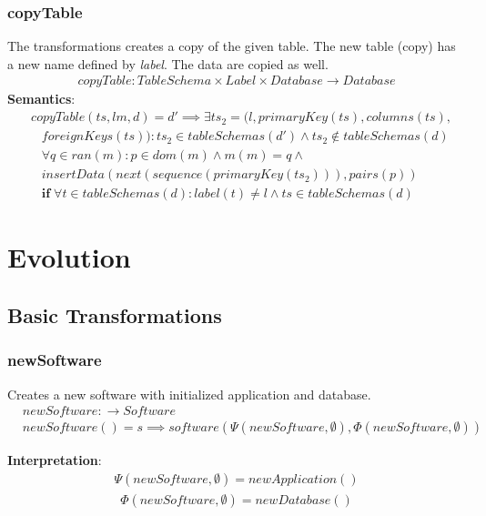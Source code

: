 \documentclass[10pt]{article}
\begin{document}
\subsubsection{copyTable}
The transformations creates a copy of the given table. The new table (copy) has a new name defined by \emph{label}. The data are copied as well.
\begin{align}
copyTable: TableSchema \times Label \times Database \rightarrow Database 
\end{align}
\noindent \textbf{Semantics}:
\begin{align}
& copyTable(ts, l m, d) = d' \implies
\exists ts_2 = (l, primaryKey(ts), columns(ts), \nonumber \\
& \;\;\; foreignKeys(ts)) : ts_2 \in tableSchemas(d') \land ts_2 \notin tableSchemas(d) \nonumber \\
& \;\;\; \forall q \in ran(m) : p \in dom(m) \land m(m) = q \land \nonumber \\  
& \;\;\; insertData(next(sequence(primaryKey(ts_2))), pairs(p))  \nonumber \\
& \;\;\; \mathbf{if} \; \forall t \in tableSchemas(d) : label(t) \neq l \land ts \in tableSchemas(d)
\end{align}


\section{Evolution}
\subsection{Basic Transformations}

\subsubsection{newSoftware}
Creates a new software with initialized application and database.
\begin{align}
& newSoftware: \rightarrow Software \\
& newSoftware() = s \implies software(\Psi(newSoftware, \emptyset), \Phi(newSoftware, \emptyset))
\end{align}

\noindent \textbf{Interpretation}:
\begin{align}
\Psi(newSoftware, \emptyset) = newApplication()
\end{align}
\begin{align}
\Phi(newSoftware, \emptyset) = newDatabase()
\end{align}
\end{document}
